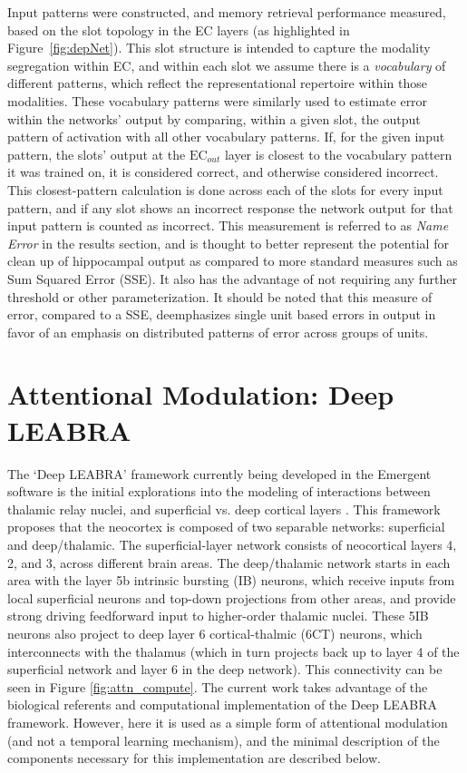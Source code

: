\documentclass[11pt, titlepage, twoside]{article}
\begin{document}

Input patterns were constructed, and memory retrieval performance measured, based on the slot topology in the EC layers (as highlighted in Figure~\ref{fig:depNet}).  This slot structure is intended to capture the modality segregation within EC, and within each slot we assume there is a {\em vocabulary} of different patterns, which reflect the representational repertoire within those modalities.  These vocabulary patterns were similarly used to estimate error within the networks' output by comparing, within a given slot, the output pattern of activation with all other vocabulary patterns.  If, for the given input pattern, the slots' output at the $\mathrm{EC}_{out}$ layer is closest to the vocabulary pattern it was trained on, it is considered correct, and otherwise considered incorrect.  This closest-pattern calculation is done across each of the slots for every input pattern, and if any slot shows an incorrect response the network output for that input pattern is counted as incorrect.  This measurement is referred to as \emph{Name Error} in the results section, and is thought to better represent the potential for clean up of hippocampal output as compared to more standard measures such as Sum Squared Error (SSE).    It also has the advantage of not requiring any further threshold or other parameterization.  It should be noted that this measure of error, compared to a SSE, deemphasizes single unit based errors in output in favor of an emphasis on distributed patterns of error across groups of units.


\section{Attentional Modulation: Deep LEABRA}
\label{appDeepLeabra}

The `Deep LEABRA' framework currently being developed in the Emergent software is the initial explorations into the modeling of interactions between thalamic relay nuclei, and superficial vs. deep cortical layers \cite{OReillyWyatteRohrlich14}.  This framework proposes that the neocortex is composed of two separable networks: superficial and deep/thalamic. The superficial-layer network consists of neocortical layers 4, 2, and 3, across different brain areas.  The deep/thalamic network starts in each area with the layer 5b intrinsic bursting (IB) neurons, which receive inputs from local superficial neurons and top-down projections from other areas, and provide strong driving feedforward input to higher-order thalamic nuclei. These 5IB neurons also project to deep layer 6 cortical-thalmic (6CT) neurons, which interconnects with the thalamus (which in turn projects back up to layer 4 of the superficial network and layer 6 in the deep network).  This connectivity can be seen in Figure \ref{fig:attn_compute}.  The current work takes advantage of the biological referents and computational implementation of the Deep LEABRA framework.  However, here it is used as a simple form of attentional modulation (and not a temporal learning mechanism), and the minimal description of the components necessary for this implementation are described below.  
\end{document}
